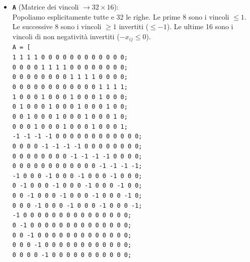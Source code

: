 \documentclass[12pt, a4paper]{article}
\begin{document}
\begin{itemize}
		\item \textbf{\texttt{A}} (Matrice dei vincoli $\rightarrow 32 \times 16$):\\
		Popoliamo esplicitamente tutte e 32 le righe. 
		Le prime 8 sono i vincoli $\leq 1$. 
		Le successive 8 sono i vincoli $\geq 1$ invertiti ($\leq -1$). 
		Le ultime 16 sono i vincoli di non negatività invertiti ($-x_{ij} \leq 0$).\\
		\texttt{A = [}\\
		\texttt{1  1  1  1  0  0  0  0  0  0  0  0  0  0  0  0;}\\
		\texttt{0  0  0  0  1  1  1  1  0  0  0  0  0  0  0  0;}\\
		\texttt{0  0  0  0  0  0  0  0  1  1  1  1  0  0  0  0;}\\
		\texttt{0  0  0  0  0  0  0  0  0  0  0  0  1  1  1  1;}\\
		\texttt{1  0  0  0  1  0  0  0  1  0  0  0  1  0  0  0;}\\
		\texttt{0  1  0  0  0  1  0  0  0  1  0  0  0  1  0  0;}\\
		\texttt{0  0  1  0  0  0  1  0  0  0  1  0  0  0  1  0;}\\
		\texttt{0  0  0  1  0  0  0  1  0  0  0  1  0  0  0  1;}\\
		\texttt{-1 -1 -1 -1  0  0  0  0  0  0  0  0  0  0  0  0;}\\
		\texttt{0  0  0  0 -1 -1 -1 -1  0  0  0  0  0  0  0  0;}\\
		\texttt{0  0  0  0  0  0  0  0 -1 -1 -1 -1  0  0  0  0;}\\
		\texttt{0  0  0  0  0  0  0  0  0  0  0  0 -1 -1 -1 -1;}\\
		\texttt{-1  0  0  0 -1  0  0  0 -1  0  0  0 -1  0  0  0;}\\
		\texttt{0 -1  0  0  0 -1  0  0  0 -1  0  0  0 -1  0  0;}\\
		\texttt{0  0 -1  0  0  0 -1  0  0  0 -1  0  0  0 -1  0;}\\
		\texttt{0  0  0 -1  0  0  0 -1  0  0  0 -1  0  0  0 -1;}\\
		\texttt{-1  0  0  0  0  0  0  0  0  0  0  0  0  0  0  0;}\\
		\texttt{0 -1  0  0  0  0  0  0  0  0  0  0  0  0  0  0;}\\
		\texttt{0  0 -1  0  0  0  0  0  0  0  0  0  0  0  0  0;}\\
		\texttt{0  0  0 -1  0  0  0  0  0  0  0  0  0  0  0  0;}\\
		\texttt{0  0  0  0 -1  0  0  0  0  0  0  0  0  0  0  0;}\\

\end{itemize}
\end{document}

